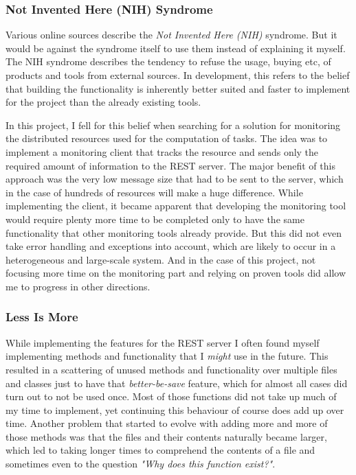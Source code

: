         \subsubsection{Not Invented Here (NIH) Syndrome}
        \label{sec:nih-technical-reflection}

            Various online sources describe the \emph{Not Invented Here (NIH)} syndrome. But it would be against the syndrome itself to use them instead of explaining it myself.
            The NIH syndrome describes the tendency to refuse the usage, buying etc, of products and tools from external sources. 
            In development, this refers to the belief that building the functionality is inherently better suited and faster to implement for the project than the already existing tools.
            
            In this project, I fell for this belief when searching for a solution for monitoring the distributed resources used for the computation of tasks.
            The idea was to implement a monitoring client that tracks the resource and sends only the required amount of information to the REST server. 
            The major benefit of this approach was the very low message size that had to be sent to the server, which in the case of hundreds of resources will make a huge difference.
            While implementing the client, it became apparent that developing the monitoring tool would require plenty more time to be completed only to have the same functionality that other monitoring tools already provide.
            But this did not even take error handling and exceptions into account, which are likely to occur in a heterogeneous and large-scale system.
            And in the case of this project, not focusing more time on the monitoring part and relying on proven tools did allow me to progress in other directions.
            

        \subsubsection{Less Is More}

            While implementing the features for the REST server I often found myself implementing methods and functionality that I \emph{might} use in the future. 
            This resulted in a scattering of unused methods and functionality over multiple files and classes just to have that \emph{better-be-save} feature, which for almost all cases did turn out to not be used once.
            Most of those functions did not take up much of my time to implement, yet continuing this behaviour of course does add up over time.
            Another problem that started to evolve with adding more and more of those methods was that the files and their contents naturally became larger, which led to taking longer times to comprehend the contents of a file and sometimes even to the question \emph{"Why does this function exist?"}.

